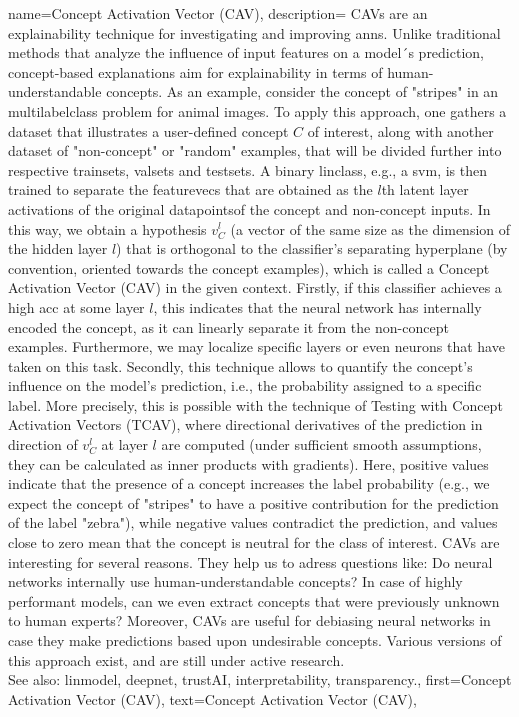 {name={Concept Activation Vector (CAV)},
	description={ 
CAVs \cite{kim2018interpretability} are an \gls{explainability} technique for investigating and improving \glspl{ann}. Unlike traditional methods that analyze the influence of input \glspl{feature} on a \gls{model}´s \gls{prediction}, concept-based \glspl{explanation} aim for \gls{explainability} in terms of human-understandable concepts. As an example, consider the concept of "stripes" in an \gls{multilabelclass} problem for animal images.
To apply this approach, one gathers a \gls{dataset} that illustrates a user-defined concept $C$ of interest, along with another \gls{dataset} of "non-concept" or "random" examples, that will be divided further into respective \glspl{trainset}, \glspl{valset}
and \glspl{testset}. A binary \gls{linclass}, e.g., a \gls{svm}, is then trained 
 to separate the \glspl{featurevec} that are obtained as the $l$th latent layer activations of the original \glspl{datapoint}of the concept and non-concept inputs. In this way, we obtain a \gls{hypothesis} $v_C^l$ (a \gls{vector} of the same size as the dimension of the hidden layer $l$) that is orthogonal to the \gls{classifier}'s separating hyperplane (by convention, oriented towards the concept examples), which is called a Concept Activation Vector (CAV) in the given context.
 Firstly, if this \gls{classifier} achieves a high \gls{acc} at some layer $l$, this indicates that the neural network has internally encoded the concept, as it can linearly separate it from the non-concept examples. Furthermore, we may localize specific layers or even neurons that have taken on this task.
 Secondly, this technique allows to quantify the concept's influence on the \gls{model}'s \gls{prediction}, i.e., the \gls{probability} assigned to a specific \gls{label}. More precisely, this is possible with the technique of
Testing with Concept Activation Vectors (TCAV), where directional derivatives of the \gls{prediction} in direction of $v_C^l$ at layer $l$ are computed 
 (under sufficient \gls{smooth} assumptions, they can be calculated as inner products with \gls{gradient}s). Here, positive values indicate that the presence of a concept increases the \gls{label} \gls{probability} (e.g., we expect the concept of "stripes" to have a positive contribution for the prediction of the \gls{label} "zebra"), while negative values contradict the prediction, and values close to zero mean that the concept is neutral for the class of interest.
 CAVs are interesting for several reasons. They help us to adress questions like: Do neural networks internally use human-understandable concepts? In case of highly performant \glspl{model}, can we even extract concepts that were previously unknown to human experts? Moreover, CAVs are useful for debiasing neural networks in case they make predictions based upon undesirable concepts. Various versions of this approach exist, and are still under active research.
				\\
		 See also: \gls{linmodel},  \gls{deepnet},  \gls{trustAI}, \gls{interpretability}, \gls{transparency}.}, 
	first={Concept Activation Vector (CAV)},
	text={Concept Activation Vector (CAV)}, 
}
